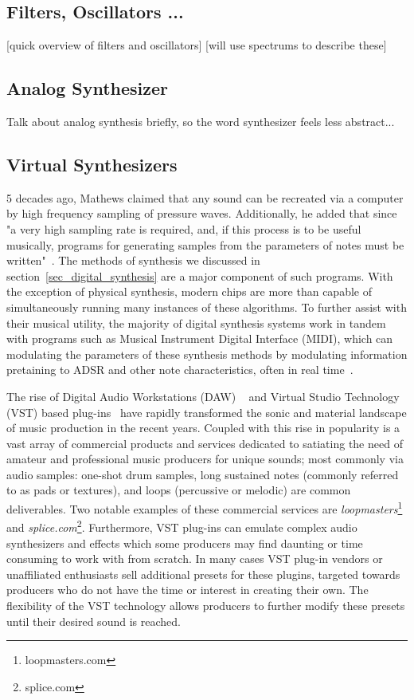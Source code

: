 \documentclass[\main/thesis.tex]{subfiles}
\begin{document}
\subsection{Filters, Oscillators ...}
[quick overview of filters and oscillators]
[will use spectrums to describe these]

\subsection{Analog Synthesizer}
Talk about analog synthesis briefly, so the word synthesizer feels less abstract...
\subsection{Virtual Synthesizers}
5 decades ago, Mathews claimed that any sound can be recreated via a computer by high frequency sampling of pressure waves. Additionally, he added that since "a very high sampling rate is required, and, if this process is to be useful musically, programs for generating samples from the parameters of notes must be written"~\cite{mathews1963digital}. The methods of synthesis we discussed in section~\ref{sec_digital_synthesis} are a major component of such programs. With the exception of physical synthesis, modern chips are more than capable of simultaneously running many instances of these algorithms. To further assist with their musical utility, the majority of digital synthesis systems work in tandem with programs such as Musical Instrument Digital Interface (MIDI), which can  modulating the parameters of these synthesis methods by modulating information pretaining to ADSR and other note characteristics, often in real time~\cite{moog1986midi}.  


 The rise of Digital Audio Workstations (DAW) ~\cite{leider2004digital} and Virtual Studio Technology (VST) based plug-ins~\cite{tanev2013virtual} have rapidly transformed the sonic and material landscape of music production in the recent years. Coupled with this rise in popularity is a vast array of commercial products and services dedicated to satiating the need of amateur and professional music producers for unique sounds; most commonly via audio samples: one-shot drum samples, long sustained notes (commonly referred to as pads or textures), and loops (percussive or melodic) are common deliverables. Two notable examples of these commercial services are \textit{loopmasters}\footnote{loopmasters.com} and \textit{splice.com}\footnote{splice.com}. Furthermore, VST plug-ins can emulate complex audio synthesizers and effects which some producers may find daunting or time consuming to work with from scratch. In many cases VST plug-in vendors or unaffiliated enthusiasts sell additional presets for these plugins, targeted towards producers who do not have the time or interest in creating their own. The flexibility of the VST technology allows producers to further modify these presets until their desired sound is reached.
\end{document}
